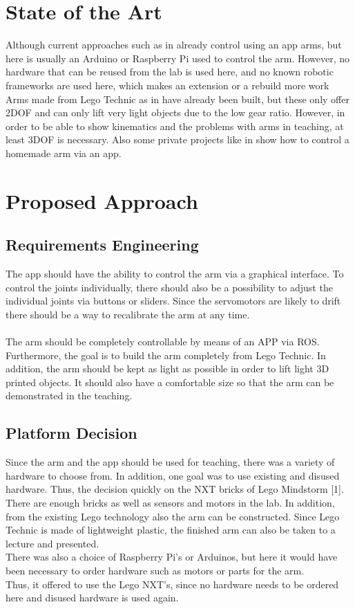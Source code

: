 \documentclass[conference]{IEEEtran}
\begin{document}
\section{State of the Art}
Although current approaches such as in \cite{onlIEEEApp-Arm} already control using an app arms, but here is usually an Arduino or Raspberry Pi used to control the arm. However, no hardware that can be reused from the lab is used here, and no known robotic frameworks are used here, which makes an extension or a rebuild more work
Arms made from Lego Technic as in \cite{onlNXT-2DOF} have already been built, but these only offer 2DOF and can only lift very light objects due to the low gear ratio. However, in order to be able to show kinematics and the problems with arms in teaching, at least 3DOF is necessary.
Also some private projects like in \cite{onlHackster} show how to control a homemade arm via an app.
\section{Proposed Approach}\label{sec:approach}

\subsection{Requirements Engineering}\label{sec:requirements}
The app should have the ability to control the arm via a graphical interface. To control the joints individually, there should also be a possibility to adjust the individual joints via buttons or sliders. Since the servomotors are likely to drift there should be a way to recalibrate the arm at any time.
\\\\
The arm should be completely controllable by means of an APP via ROS. Furthermore, the goal is to build the arm completely from Lego Technic. In addition, the arm should be kept as light as possible in order to lift light 3D printed objects. It should also have a comfortable size so that the arm can be demonstrated in the teaching.

\subsection{Platform Decision}\label{sec:platform}
Since the arm and the app should be used for teaching, there was a variety of hardware to choose from. In addition, one goal was to use existing and disused hardware. Thus, the decision quickly on the NXT bricks of Lego Mindstorm [1]. There are enough bricks as well as sensors and motors in the lab. In addition, from the existing Lego technology also the arm can be constructed. Since Lego Technic is made of lightweight plastic, the finished arm can also be taken to a lecture and presented.\\
There was also a choice of Raspberry Pi's or Arduinos, but here it would have been necessary to order hardware such as motors or parts for the arm.\\
Thus, it offered to use the Lego NXT's, since no hardware needs to be ordered here and disused hardware is used again.
\end{document}
